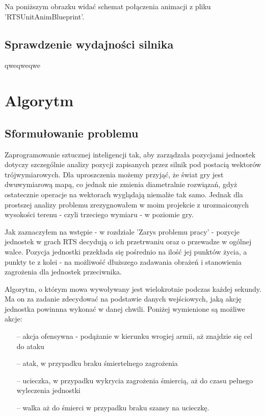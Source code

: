 \documentclass[12pt]{report}
\begin{document}
Na poniższym obrazku widać schemat połączenia animacji z pliku 'RTSUnitAnimBlueprint'.



\section{Sprawdzenie wydajności silnika}
qweqweqwe
\chapter{Algorytm}
\section{Sformułowanie problemu}
Zaprogramowanie sztucznej inteligencji tak, aby zarządzała pozycjami jednostek dotyczy szczególnie analizy pozycji zapisanych przez silnik pod postacią wektorów trójwymiarowych. Dla uproszczenia możemy przyjąć, że świat gry jest dwuwymiarową mapą, co jednak nie zmienia diametralnie rozwiązań, gdyż ostatecznie operacje na wektorach wyglądają niemalże tak samo. Jednak dla prostszej analizy problemu zrezygnowałem w moim projekcie z urozmaiconych wysokości terenu - czyli trzeciego wymiaru - w poziomie gry.

Jak zaznaczyłem na wstępie - w rozdziale 'Zarys problemu pracy' - pozycje jednostek w grach RTS decydują o ich przetrwaniu oraz o przewadze w ogólnej walce. Pozycja jednostki przekłada się pośrednio na ilość jej punktów życia, a punkty te z kolei - na możliwość dłuższego zadawania obrażeń i stanowienia zagrożenia dla jednostek przeciwnika.

Algorytm, o którym mowa wywoływany jest wielokrotnie podczas każdej sekundy. Ma on za zadanie zdecydować na podstawie danych wejściowych, jaką akcję jednostka powinnna wykonać w danej chwili. Poniżej wymienione są możliwe akcje:
\begin{itemize}
\item[--] akcja ofensywna - podążanie w kierunku wrogiej armii, aż znajdzie się cel do ataku
\item[--] atak, w przypadku braku śmiertelnego zagrożenia
\item[--] ucieczka, w przypadku wykrycia zagrożenia śmiercią, aż do czasu pełnego wyleczenia jednostki
\item[--] walka aż do śmierci w przypadku braku szansy na ucieczkę.
\end{itemize}
\end{document}

